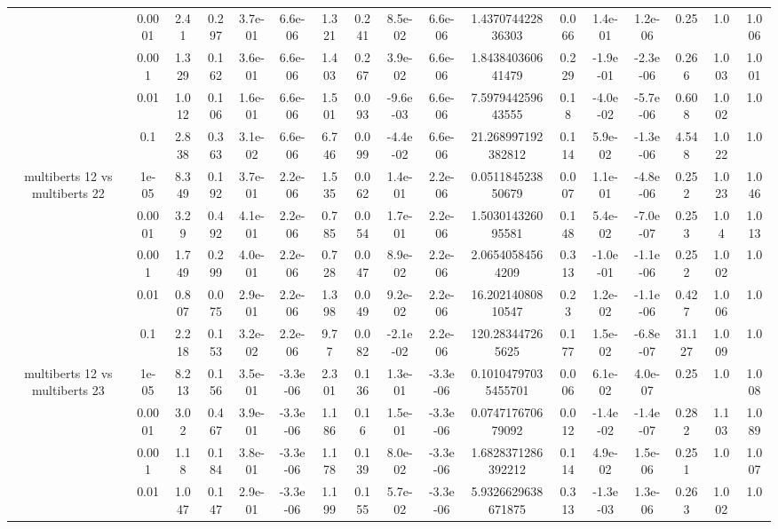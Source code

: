 \begin{tabular}{|c|c|c|c|c|c|c|c|c|c|c|c|c|c|c|c|c|}
 & 0.0001 & 2.41 & 0.297 & 3.7e-01 & 6.6e-06 & 1.321 & 0.241 & 8.5e-02 & 6.6e-06 & 1.437074422836303 & 0.066 & 1.4e-01 & 1.2e-06 & 0.25 & 1.0 & 1.006 \\
 & 0.001 & 1.329 & 0.162 & 3.6e-01 & 6.6e-06 & 1.403 & 0.267 & 3.9e-02 & 6.6e-06 & 1.843840360641479 & 0.229 & -1.9e-01 & -2.3e-06 & 0.266 & 1.003 & 1.001 \\
 & 0.01 & 1.012 & 0.106 & 1.6e-01 & 6.6e-06 & 1.501 & 0.093 & -9.6e-03 & 6.6e-06 & 7.597944259643555 & 0.18 & -4.0e-02 & -5.7e-06 & 0.608 & 1.002 & 1.0 \\
 & 0.1 & 2.838 & 0.363 & 3.1e-02 & 6.6e-06 & 6.746 & 0.099 & -4.4e-02 & 6.6e-06 & 21.268997192382812 & 0.114 & 5.9e-02 & -1.3e-06 & 4.548 & 1.022 & 1.0 \\
\hline
\multirow{5}{*}{multiberts 12 vs multiberts 22} & 1e-05 & 8.349 & 0.192 & 3.7e-01 & 2.2e-06 & 1.535 & 0.062 & 1.4e-01 & 2.2e-06 & 0.051184523850679 & 0.007 & 1.1e-01 & -4.8e-06 & 0.252 & 1.023 & 1.046 \\
 & 0.0001 & 3.29 & 0.492 & 4.1e-01 & 2.2e-06 & 0.785 & 0.054 & 1.7e-01 & 2.2e-06 & 1.503014326095581 & 0.148 & 5.4e-02 & -7.0e-07 & 0.253 & 1.04 & 1.013 \\
 & 0.001 & 1.749 & 0.299 & 4.0e-01 & 2.2e-06 & 0.728 & 0.047 & 8.9e-02 & 2.2e-06 & 2.06540584564209 & 0.313 & -1.0e-01 & -1.1e-06 & 0.252 & 1.002 & 1.0 \\
 & 0.01 & 0.807 & 0.075 & 2.9e-01 & 2.2e-06 & 1.398 & 0.049 & 9.2e-02 & 2.2e-06 & 16.20214080810547 & 0.23 & 1.2e-02 & -1.1e-06 & 0.427 & 1.006 & 1.0 \\
 & 0.1 & 2.218 & 0.153 & 3.2e-02 & 2.2e-06 & 9.77 & 0.082 & -2.1e-02 & 2.2e-06 & 120.283447265625 & 0.177 & 1.5e-02 & -6.8e-07 & 31.127 & 1.009 & 1.0 \\
\hline
\multirow{5}{*}{multiberts 12 vs multiberts 23} & 1e-05 & 8.213 & 0.156 & 3.5e-01 & -3.3e-06 & 2.301 & 0.136 & 1.3e-01 & -3.3e-06 & 0.10104797035455701 & 0.006 & 6.1e-02 & 4.0e-07 & 0.25 & 1.0 & 1.008 \\
 & 0.0001 & 3.02 & 0.467 & 3.9e-01 & -3.3e-06 & 1.186 & 0.16 & 1.5e-01 & -3.3e-06 & 0.074717670679092 & 0.012 & -1.4e-02 & -1.4e-07 & 0.282 & 1.103 & 1.089 \\
 & 0.001 & 1.18 & 0.184 & 3.8e-01 & -3.3e-06 & 1.178 & 0.139 & 8.0e-02 & -3.3e-06 & 1.6828371286392212 & 0.114 & 4.9e-02 & 1.5e-06 & 0.251 & 1.0 & 1.007 \\
 & 0.01 & 1.047 & 0.147 & 2.9e-01 & -3.3e-06 & 1.199 & 0.155 & 5.7e-02 & -3.3e-06 & 5.9326629638671875 & 0.313 & -1.3e-03 & 1.3e-06 & 0.263 & 1.002 & 1.0 \\

\end{tabular}
